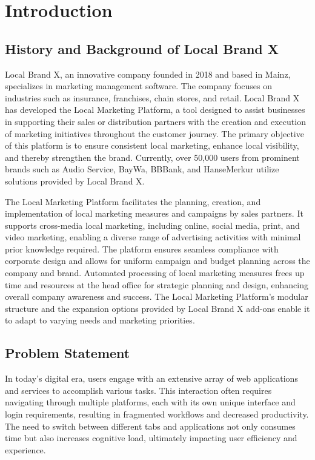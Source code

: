 \chapter{Introduction}
\label{ch:introduction}


\section{History and Background of Local Brand X}
\label{sec:intro:background}
Local Brand X, an innovative company founded in 2018 and based in Mainz, specializes in marketing management software. The company focuses on industries such as insurance, franchises, chain stores, and retail. Local Brand X has developed the Local Marketing Platform, a tool designed to assist businesses in supporting their sales or distribution partners with the creation and execution of marketing initiatives throughout the customer journey. The primary objective of this platform is to ensure consistent local marketing, enhance local visibility, and thereby strengthen the brand. Currently, over 50,000 users from prominent brands such as Audio Service, BayWa, BBBank, and HanseMerkur utilize solutions provided by Local Brand X.

The Local Marketing Platform facilitates the planning, creation, and implementation of local marketing measures and campaigns by sales partners. It supports cross-media local marketing, including online, social media, print, and video marketing, enabling a diverse range of advertising activities with minimal prior knowledge required. The platform ensures seamless compliance with corporate design and allows for uniform campaign and budget planning across the company and brand. Automated processing of local marketing measures frees up time and resources at the head office for strategic planning and design, enhancing overall company awareness and success. The Local Marketing Platform's modular structure and the expansion options provided by Local Brand X add-ons enable it to adapt to varying needs and marketing priorities.

%
%
\section{Problem Statement}
\label{sec:intro:motivation}
In today's digital era, users engage with an extensive array of web applications and services to accomplish various tasks. This interaction often requires navigating through multiple platforms, each with its own unique interface and login requirements, resulting in fragmented workflows and decreased productivity. The need to switch between different tabs and applications not only consumes time but also increases cognitive load, ultimately impacting user efficiency and experience.

